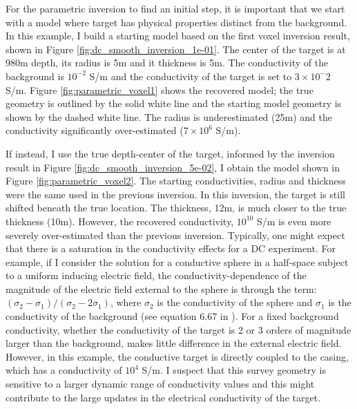 For the parametric inversion to find an initial step, it is important that we start with a model where target has physical properties distinct from the background. In this example, I build a starting model based on the first voxel inversion result, shown in Figure \ref{fig:dc_smooth_inversion_1e-01}. The center of the target is at 980m depth, its radius is 5m and it thickness is 5m. The conductivity of the background is $10^{-2}$ S/m and the conductivity of the target is set to $3 \times 10^-2$ S/m. Figure \ref{fig:parametric_voxel1} shows the recovered model; the true geometry is outlined by the solid white line and the starting model geometry is shown by the dashed white line. The radius is underestimated (25m) and the conductivity significantly over-estimated ($7 \times 10^6$ S/m).




If instead, I use the true depth-center of the target, informed by the inversion result in Figure \ref{fig:dc_smooth_inversion_5e-02}, I obtain the model shown in Figure \ref{fig:parametric_voxel2}. The starting conductivities, radius and thickness were the same used in the previous inversion. In this inversion, the target is still shifted beneath the true location. The thickness, 12m, is much closer to the true thickness (10m). However, the recovered conductivity, $10^{10}$ S/m is even more severely over-estimated than the previous inversion. Typically, one might expect that there is a saturation in the conductivity effects for a DC experiment. For example, if I consider the solution for a conductive sphere in a half-space subject to a uniform inducing electric field, the conductivity-dependence of the magnitude of the electric field external to the sphere is through the term:$(\sigma_2 - \sigma_1)/(\sigma_2 - 2\sigma_1)$, where $\sigma_2$ is the conductivity of the sphere and $\sigma_1$ is the conductivity of the background (see equation 6.67 in \cite{Ward1988}). For a fixed background conductivity, whether the conductivity of the target is 2 or 3 orders of magnitude larger than the background, makes little difference in the external electric field. However, in this example, the conductive target is directly coupled to the casing, which has a conductivity of $10^4$ S/m. I suspect that this survey geometry is sensitive to a larger dynamic range of conductivity values and this might contribute to the large updates in the electrical conductivity of the target.



